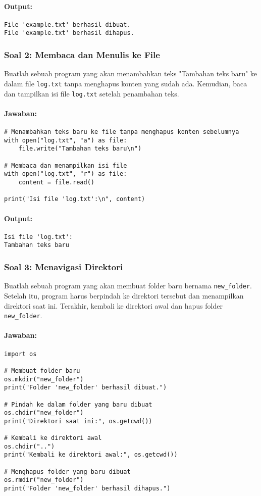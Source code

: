 \documentclass[12pt]{article}
\begin{document}
\paragraph{Output:}
\begin{verbatim}
File 'example.txt' berhasil dibuat.
File 'example.txt' berhasil dihapus.
\end{verbatim}

\subsubsection{Soal 2: Membaca dan Menulis ke File}
Buatlah sebuah program yang akan menambahkan teks "Tambahan teks baru" ke dalam file \texttt{log.txt} tanpa menghapus konten yang sudah ada. Kemudian, baca dan tampilkan isi file \texttt{log.txt} setelah penambahan teks.

\paragraph{Jawaban:}
\begin{verbatim}
# Menambahkan teks baru ke file tanpa menghapus konten sebelumnya
with open("log.txt", "a") as file:
    file.write("Tambahan teks baru\n")

# Membaca dan menampilkan isi file
with open("log.txt", "r") as file:
    content = file.read()

print("Isi file 'log.txt':\n", content)
\end{verbatim}

\paragraph{Output:}
\begin{verbatim}
Isi file 'log.txt':
Tambahan teks baru
\end{verbatim}

\subsubsection{Soal 3: Menavigasi Direktori}
Buatlah sebuah program yang akan membuat folder baru bernama \texttt{new\_folder}. Setelah itu, program harus berpindah ke direktori tersebut dan menampilkan direktori saat ini. Terakhir, kembali ke direktori awal dan hapus folder \texttt{new\_folder}.

\paragraph{Jawaban:}
\begin{verbatim}
import os

# Membuat folder baru
os.mkdir("new_folder")
print("Folder 'new_folder' berhasil dibuat.")

# Pindah ke dalam folder yang baru dibuat
os.chdir("new_folder")
print("Direktori saat ini:", os.getcwd())

# Kembali ke direktori awal
os.chdir("..")
print("Kembali ke direktori awal:", os.getcwd())

# Menghapus folder yang baru dibuat
os.rmdir("new_folder")
print("Folder 'new_folder' berhasil dihapus.")
\end{verbatim}
\end{document}
